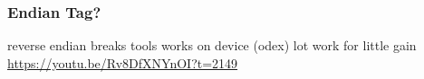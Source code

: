\subsubsection{Endian Tag?}
reverse endian\newline
breaks tools works on device (odex)\newline
lot work for little gain\newline
\url{https://youtu.be/Rv8DfXNYnOI?t=2149}
